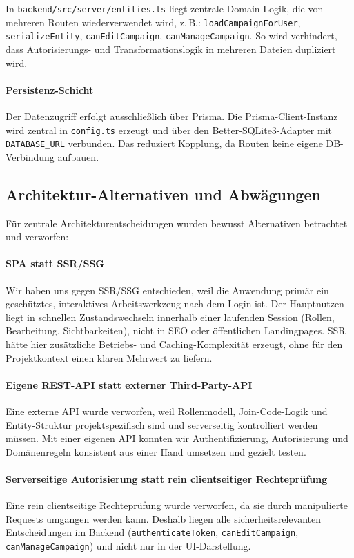 In \texttt{backend/src/server/entities.ts} liegt zentrale Domain-Logik, die von
mehreren Routen wiederverwendet wird, z.\,B.:
\texttt{loadCampaignForUser}, \texttt{serializeEntity},
\texttt{canEditCampaign}, \texttt{canManageCampaign}.
So wird verhindert, dass Autorisierungs- und Transformationslogik in mehreren
Dateien dupliziert wird.

\paragraph{Persistenz-Schicht}
Der Datenzugriff erfolgt ausschließlich über Prisma.
Die Prisma-Client-Instanz wird zentral in \texttt{config.ts} erzeugt und über
den Better-SQLite3-Adapter mit \texttt{DATABASE\_URL} verbunden.
Das reduziert Kopplung, da Routen keine eigene DB-Verbindung aufbauen.

\subsection{Architektur-Alternativen und Abwägungen}

Für zentrale Architekturentscheidungen wurden bewusst Alternativen betrachtet
und verworfen:

\paragraph{SPA statt SSR/SSG}
Wir haben uns gegen SSR/SSG entschieden, weil die Anwendung primär ein
geschütztes, interaktives Arbeitswerkzeug nach dem Login ist.
Der Hauptnutzen liegt in schnellen Zustandswechseln innerhalb einer laufenden
Session (Rollen, Bearbeitung, Sichtbarkeiten), nicht in SEO oder öffentlichen
Landingpages.
SSR hätte hier zusätzliche Betriebs- und Caching-Komplexität erzeugt, ohne
für den Projektkontext einen klaren Mehrwert zu liefern.

\paragraph{Eigene REST-API statt externer Third-Party-API}
Eine externe API wurde verworfen, weil Rollenmodell, Join-Code-Logik und
Entity-Struktur projektspezifisch sind und serverseitig kontrolliert werden
müssen.
Mit einer eigenen API konnten wir Authentifizierung, Autorisierung und
Domänenregeln konsistent aus einer Hand umsetzen und gezielt testen.

\paragraph{Serverseitige Autorisierung statt rein clientseitiger Rechteprüfung}
Eine rein clientseitige Rechteprüfung wurde verworfen, da sie durch manipulierte
Requests umgangen werden kann.
Deshalb liegen alle sicherheitsrelevanten Entscheidungen im Backend
(\texttt{authenticateToken}, \texttt{canEditCampaign}, \texttt{canManageCampaign})
und nicht nur in der UI-Darstellung.


